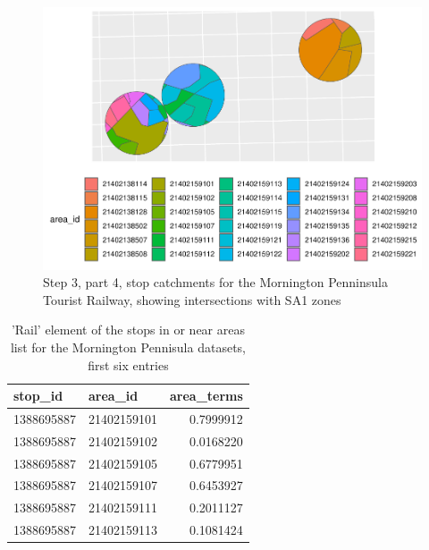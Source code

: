 \documentclass[preprint, 3p,
authoryear]{elsarticle} %
\begin{document}
\begin{figure}
\includegraphics[width=1\linewidth]{Leveraging_GTFS_to_assess_transit_supply_Transport_Geography_files/figure-latex/calculate_stop_in_or_near_areas_verbose-1} \caption{Step 3, part 4, stop catchments for the Mornington Penninsula Tourist Railway, showing intersections with SA1 zones}\label{fig:calculate_stop_in_or_near_areas_verbose}
\end{figure}

\begin{table}

\caption{\label{tab:calculate_stop_in_or_near_areas}'Rail' element of the stops in or near areas list for the Mornington Pennisula datasets, first six entries}
\centering
\begin{tabular}[t]{l|l|r}
\hline
stop\_id & area\_id & area\_terms\\
\hline
1388695887 & 21402159101 & 0.7999912\\
\hline
1388695887 & 21402159102 & 0.0168220\\
\hline
1388695887 & 21402159105 & 0.6779951\\
\hline
1388695887 & 21402159107 & 0.6453927\\
\hline
1388695887 & 21402159111 & 0.2011127\\
\hline
1388695887 & 21402159113 & 0.1081424\\
\hline
\end{tabular}
\end{table}
\end{document}
